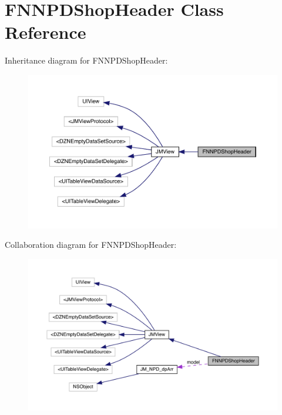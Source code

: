 \hypertarget{interface_f_n_n_p_d_shop_header}{}\section{F\+N\+N\+P\+D\+Shop\+Header Class Reference}
\label{interface_f_n_n_p_d_shop_header}


Inheritance diagram for F\+N\+N\+P\+D\+Shop\+Header\+:\nopagebreak
\begin{figure}[H]
\begin{center}
\leavevmode
\includegraphics[width=350pt]{interface_f_n_n_p_d_shop_header__inherit__graph}
\end{center}
\end{figure}


Collaboration diagram for F\+N\+N\+P\+D\+Shop\+Header\+:\nopagebreak
\begin{figure}[H]
\begin{center}
\leavevmode
\includegraphics[width=350pt]{interface_f_n_n_p_d_shop_header__coll__graph}
\end{center}
\end{figure}
